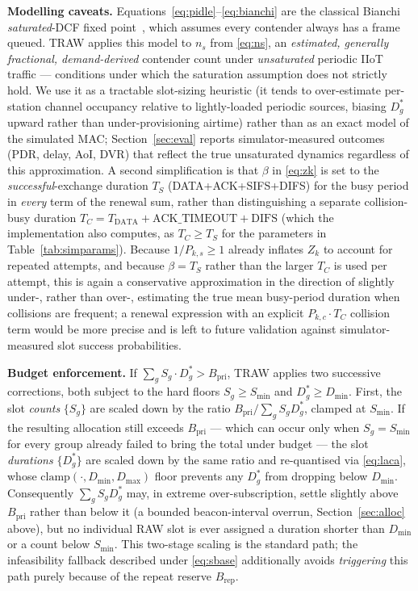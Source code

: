 \documentclass[journal]{IEEEtran}
\begin{document}
\textbf{Modelling caveats.}
Equations~\eqref{eq:pidle}--\eqref{eq:bianchi} are the classical
Bianchi \emph{saturated}-DCF fixed point~\cite{bianchi2000}, which
assumes every contender always has a frame queued.
TRAW applies this model to $n_s$ from \eqref{eq:ns}, an
\emph{estimated, generally fractional, demand-derived} contender
count under \emph{unsaturated} periodic IIoT traffic --- conditions
under which the saturation assumption does not strictly hold.
We use it as a tractable slot-sizing heuristic (it
tends to over-estimate per-station channel occupancy relative to
lightly-loaded periodic sources, biasing $D_g^*$ upward rather than
under-provisioning airtime) rather than as an exact model of the
simulated MAC; Section~\ref{sec:eval} reports simulator-measured outcomes
(PDR, delay, AoI, DVR) that reflect the true unsaturated dynamics
regardless of this approximation.
A second simplification is that $\beta$ in \eqref{eq:zk} is set to the
\emph{successful}-exchange duration $T_S$ (DATA+ACK+SIFS+DIFS) for the
busy period in \emph{every} term of the renewal sum, rather than
distinguishing a separate collision-busy duration
$T_C\!=\!T_\mathrm{DATA}+\text{ACK\_TIMEOUT}+\text{DIFS}$ (which the
implementation also computes, as $T_C\!\geq\!T_S$ for the parameters
in Table~\ref{tab:simparams}).
Because $1/P_{k,s}\!\geq\!1$ already inflates $Z_k$ to account for
repeated attempts, and because $\beta\!=\!T_S$ rather than the larger
$T_C$ is used per attempt, this is again a conservative
approximation in the direction of slightly under-, rather than
over-, estimating the true mean busy-period duration when collisions
are frequent; a renewal expression with an explicit
$P_{k,c}\!\cdot\!T_C$ collision term would be more precise and is left
to future validation against simulator-measured slot success
probabilities.

\textbf{Budget enforcement.}
If $\sum_g S_g\cdot D_g^*\!>\!B_\mathrm{pri}$, TRAW applies two
successive corrections, both subject to the hard floors
$S_g\!\geq\!S_\mathrm{min}$ and $D_g^*\!\geq\!D_\mathrm{min}$.
First, the slot \emph{counts} $\{S_g\}$ are scaled down by the ratio
$B_\mathrm{pri}/\sum_g S_g D_g^*$, clamped at $S_\mathrm{min}$.
If the resulting allocation still exceeds $B_\mathrm{pri}$ ---
which can occur only when $S_g\!=\!S_\mathrm{min}$ for every group
already failed to bring the total under budget --- the slot
\emph{durations} $\{D_g^*\}$ are scaled down by the same
ratio and re-quantised via \eqref{eq:laca}, whose
$\mathrm{clamp}(\cdot,D_\mathrm{min},D_\mathrm{max})$ floor prevents
any $D_g^*$ from dropping below $D_\mathrm{min}$.
Consequently $\sum_g S_g D_g^*$ may, in extreme over-subscription,
settle slightly above $B_\mathrm{pri}$ rather than below it (a bounded
beacon-interval overrun, Section~\ref{sec:alloc} above), but no individual
RAW slot is ever assigned a duration shorter than $D_\mathrm{min}$ or
a count below $S_\mathrm{min}$.
This two-stage scaling is the standard path; the infeasibility
fallback described under \eqref{eq:sbase} additionally avoids
\emph{triggering} this path purely because of the repeat reserve
$B_\mathrm{rep}$.
\end{document}
